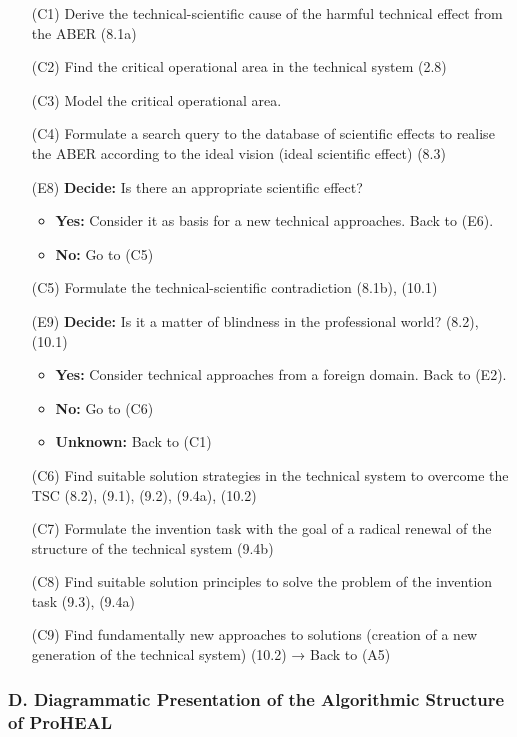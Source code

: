 \documentclass[12pt,a4paper]{article}
\begin{document}
\begin{itemize}[leftmargin=35pt,align=left]
\item[(C1)] Derive the technical-scientific cause of the harmful technical
  effect from the ABER (8.1a)
\item[(C2)] Find the critical operational area in the technical system (2.8)
\item[(C3)] Model the critical operational area.
\item[(C4)] Formulate a search query to the database of scientific effects to
  realise the ABER according to the ideal vision (ideal scientific effect)
  (8.3)
\item[(E8)] \textbf{Decide:} Is there an appropriate scientific effect?
  \begin{itemize}[leftmargin=20pt]
  \item \textbf{Yes:} Consider it as basis for a new technical approaches.
    Back to (E6).
  \item \textbf{No:} Go to (C5)
  \end{itemize}
\item[(C5)] Formulate the technical-scientific contradiction (8.1b), (10.1)
\item[(E9)] \textbf{Decide:} Is it a matter of blindness in the professional
  world? (8.2), (10.1)
  \begin{itemize}[leftmargin=20pt]
  \item \textbf{Yes:} Consider technical approaches from a foreign
    domain. Back to (E2).
  \item \textbf{No:} Go to (C6)
  \item \textbf{Unknown:} Back to (C1)
  \end{itemize}
\item[(C6)] Find suitable solution strategies in the technical system to
  overcome the TSC (8.2), (9.1), (9.2), (9.4a), (10.2)
\item[(C7)] Formulate the invention task with the goal of a radical renewal of
  the structure of the technical system (9.4b)
\item[(C8)] Find suitable solution principles to solve the problem of the
  invention task (9.3), (9.4a)
\item[(C9)] Find fundamentally new approaches to solutions (creation of a new
  generation of the technical system) (10.2) → Back to (A5)
\end{itemize}
\newpage
\subsubsection*{D. Diagrammatic Presentation of the Algorithmic Structure of
  ProHEAL}  
\end{document}
